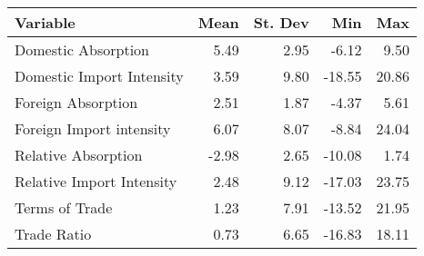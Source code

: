
\begin{tabular}{lrrrr}
\toprule
Variable & Mean & St. Dev & Min & Max\\
\midrule
Domestic Absorption & 5.49 & 2.95 & -6.12 & 9.50\\
Domestic Import Intensity & 3.59 & 9.80 & -18.55 & 20.86\\
Foreign Absorption & 2.51 & 1.87 & -4.37 & 5.61\\
Foreign Import intensity & 6.07 & 8.07 & -8.84 & 24.04\\
Relative Absorption & -2.98 & 2.65 & -10.08 & 1.74\\
\addlinespace
Relative Import Intensity & 2.48 & 9.12 & -17.03 & 23.75\\
Terms of Trade & 1.23 & 7.91 & -13.52 & 21.95\\
Trade Ratio & 0.73 & 6.65 & -16.83 & 18.11\\
\bottomrule
\end{tabular}
